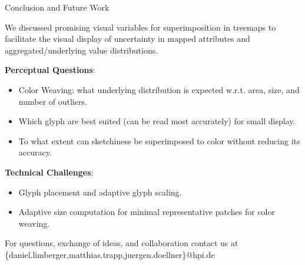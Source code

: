 \documentclass[aspectratio=169,10pt,english]{beamer}
\begin{document}
\begin{frame}[t]{Conclusion and Future Work}

    We discussed promising visual variables for superimposition in treemaps to facilitate the visual display of uncertainty in mapped attributes and aggregated/underlying value distributions.

    \bigskip

    \textbf{Perceptual Questions}:
    \begin{itemize}
        \item Color Weaving: what underlying distribution is expected w.r.t. area, size, and number of outliers.
        \item Which glyph are best suited (can be read most accurately) for small display. 
        \item To what extent can sketchiness be superimposed to color without reducing its accuracy.
    \end{itemize}
    \medskip
    
    \textbf{Technical Challenges}:
    \begin{itemize}
        \item Glyph placement and adaptive glyph scaling.
        \item Adaptive size computation for minimal representative patches for color weaving.
    \end{itemize}
    \bigskip
    
    For questions, exchange of ideas, and collaboration contact us at \{daniel.limberger,matthias.trapp,juergen.doellner\}@hpi.de

\end{frame} 
\end{document}
